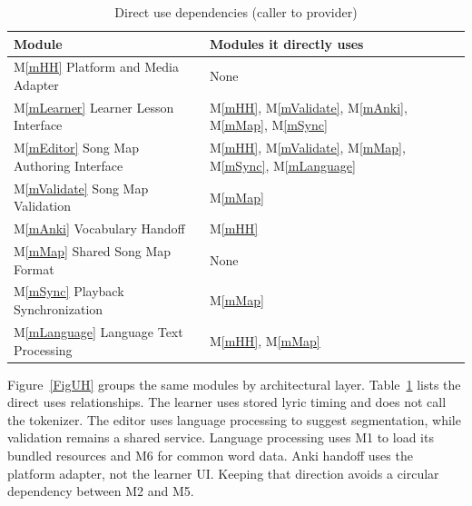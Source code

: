 \documentclass[12pt, titlepage]{article}
\newcommand{\mref}[1]{M\ref{#1}}
\begin{document}
\begin{table}[H]
\centering
\begin{tabularx}{\textwidth}{@{}lX@{}}
\toprule
\textbf{Module} & \textbf{Modules it directly uses}\\
\midrule
\mref{mHH} Platform and Media Adapter & None\\
\mref{mLearner} Learner Lesson Interface &
\mref{mHH}, \mref{mValidate}, \mref{mAnki}, \mref{mMap},
\mref{mSync}\\
\mref{mEditor} Song Map Authoring Interface &
\mref{mHH}, \mref{mValidate}, \mref{mMap}, \mref{mSync},
\mref{mLanguage}\\
\mref{mValidate} Song Map Validation & \mref{mMap}\\
\mref{mAnki} Vocabulary Handoff & \mref{mHH}\\
\mref{mMap} Shared Song Map Format & None\\
\mref{mSync} Playback Synchronization & \mref{mMap}\\
\mref{mLanguage} Language Text Processing &
\mref{mHH}, \mref{mMap}\\
\bottomrule
\end{tabularx}
\caption{Direct use dependencies (caller to provider)}
\label{TblUses}
\end{table}

Figure~\ref{FigUH} groups the same modules by architectural layer.
Table~\ref{TblUses} lists the direct uses relationships.
The learner uses stored lyric timing and does not call the tokenizer.
The editor uses language processing to suggest segmentation, while
validation remains a shared service. Language processing uses M1
to load its bundled resources and M6 for common word data.
Anki handoff uses the platform adapter, not the learner UI.
Keeping that direction avoids a circular dependency between M2
and M5.
\end{document}
